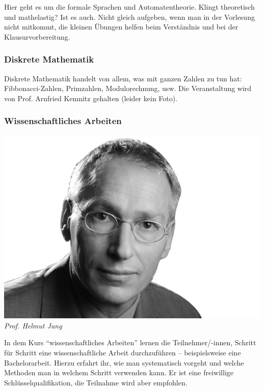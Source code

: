 Hier geht es um die formale Sprachen und Automatentheorie. Klingt
theoretisch und mathelastig? Ist es auch. Nicht gleich aufgeben, wenn
man in der Vorlesung nicht mitkommt, die kleinen Übungen helfen beim
Verständnis und bei der Klausurvorbereitung.

\subsubsection{Diskrete Mathematik}

Diskrete Mathematik handelt von allem, was mit ganzen Zahlen zu tun
hat: Fibbonacci-Zahlen, Primzahlen, Modulorechnung, usw.
Die Veranstaltung wird von Prof. Arnfried Kemnitz gehalten (leider kein Foto).

\subsubsection{Wissenschaftliches Arbeiten}

\includegraphics[width=0.9\linewidth]{bilder/dozenten/jung_frei.png}\\
\textit{Prof. Helmut Jung}

In dem Kurs "`wissenschaftliches Arbeiten"' lernen die Teilnehmer/-innen, Schritt für Schritt eine wissenschaftliche Arbeit durchzuführen -- beispielsweise eine Bachelorarbeit.
Hierzu erfahrt ihr, wie man systematisch vorgeht und welche Methoden
man in welchem Schritt verwenden kann. Er ist eine freiwillige
Schlüsselqualifikation, die Teilnahme wird aber empfohlen.

